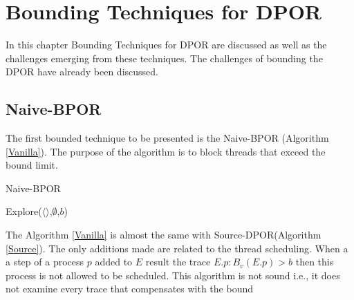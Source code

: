 \chapter{Bounding Techniques for DPOR}

In this chapter Bounding Techniques for DPOR are discussed as well as the challenges emerging from these techniques.
The challenges of bounding the DPOR have already been discussed.


\section{Naive-BPOR}

The first bounded technique to be presented is the Naive-BPOR (Algorithm \ref{Vanilla}). The purpose of the algorithm is to block threads that exceed the bound
limit. 

\begin{algorithm}
    \caption{Naive-BPOR}
    \label{Vanilla}
    Explore($\langle \rangle$,$\emptyset$,$b$)\;
\end{algorithm}

The Algorithm \ref{Vanilla} is almost the same with Source-DPOR(Algorithm \ref{Source}). The only additions made are related to the 
thread scheduling. When a a step of a process $p$ added to $E$ result the trace $E.p : B_v(E.p) > b$ then this process is not allowed to be scheduled.
This algorithm is not sound i.e., it does not examine every trace that compensates with the bound


